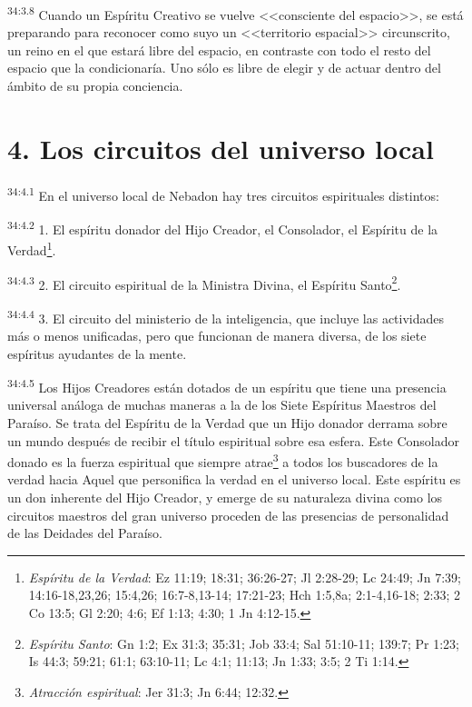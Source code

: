 \par
\textsuperscript{34:3.8} Cuando un Espíritu Creativo se vuelve <<consciente del espacio>>, se está preparando para reconocer como suyo un <<territorio espacial>> circunscrito, un reino en el que estará libre del espacio, en contraste con todo el resto del espacio que la condicionaría. Uno sólo es libre de elegir y de actuar dentro del ámbito de su propia conciencia.

\section*{4. Los circuitos del universo local}
\par
\textsuperscript{34:4.1} En el universo local de Nebadon hay tres circuitos espirituales distintos:

\par
\textsuperscript{34:4.2} 1. El espíritu donador del Hijo Creador, el Consolador, el Espíritu de la Verdad\footnote{\textit{Espíritu de la Verdad}: Ez 11:19; 18:31; 36:26-27; Jl 2:28-29; Lc 24:49; Jn 7:39; 14:16-18,23,26; 15:4,26; 16:7-8,13-14; 17:21-23; Hch 1:5,8a; 2:1-4,16-18; 2:33; 2 Co 13:5; Gl 2:20; 4:6; Ef 1:13; 4:30; 1 Jn 4:12-15.}.

\par
\textsuperscript{34:4.3} 2. El circuito espiritual de la Ministra Divina, el Espíritu Santo\footnote{\textit{Espíritu Santo}: Gn 1:2; Ex 31:3; 35:31; Job 33:4; Sal 51:10-11; 139:7; Pr 1:23; Is 44:3; 59:21; 61:1; 63:10-11; Lc 4:1; 11:13; Jn 1:33; 3:5; 2 Ti 1:14.}.

\par
\textsuperscript{34:4.4} 3. El circuito del ministerio de la inteligencia, que incluye las actividades más o menos unificadas, pero que funcionan de manera diversa, de los siete espíritus ayudantes de la mente.

\par
\textsuperscript{34:4.5} Los Hijos Creadores están dotados de un espíritu que tiene una presencia universal análoga de muchas maneras a la de los Siete Espíritus Maestros del Paraíso. Se trata del Espíritu de la Verdad que un Hijo donador derrama sobre un mundo después de recibir el título espiritual sobre esa esfera. Este Consolador donado es la fuerza espiritual que siempre atrae\footnote{\textit{Atracción espiritual}: Jer 31:3; Jn 6:44; 12:32.} a todos los buscadores de la verdad hacia Aquel que personifica la verdad en el universo local. Este espíritu es un don inherente del Hijo Creador, y emerge de su naturaleza divina como los circuitos maestros del gran universo proceden de las presencias de personalidad de las Deidades del Paraíso.

